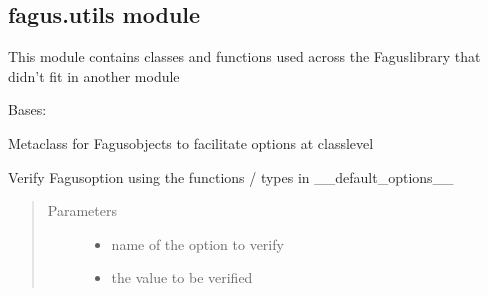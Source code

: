 \documentclass[a4paper,10pt,english]{sphinxmanual}
\begin{document}
\subsection{fagus.utils module}
\label{\detokenize{fagus.utils:module-fagus.utils}}\label{\detokenize{fagus.utils:fagus-utils-module}}\label{\detokenize{fagus.utils::doc}}
\sphinxAtStartPar
This module contains classes and functions used across the Fagus\sphinxhyphen{}library that didn’t fit in another module

\begin{fulllineitems}
\label{\detokenize{fagus.utils:fagus.utils.FagusMeta}}
\pysigstartsignatures
{}
\pysigstopsignatures
\sphinxAtStartPar
Bases: 

\sphinxAtStartPar
Metaclass for Fagus\sphinxhyphen{}objects to facilitate options at class\sphinxhyphen{}level

\begin{fulllineitems}
\label{\detokenize{fagus.utils:fagus.utils.FagusMeta.__verify_option__}}
\pysigstartsignatures
{}
\pysigstopsignatures
\sphinxAtStartPar
Verify Fagus\sphinxhyphen{}option using the functions / types in \_\_default\_options\_\_
\begin{quote}\begin{description}
\item[{Parameters}] \leavevmode\begin{itemize}
\item {}
\sphinxAtStartPar
{} \textendash{} name of the option to verify

\item {}
\sphinxAtStartPar
{} \textendash{} the value to be verified


\end{itemize}
\end{description}
\end{quote}
\end{fulllineitems}
\end{fulllineitems}
\end{document}
